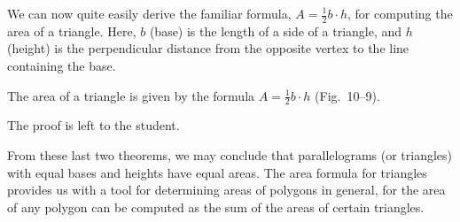 \documentclass[11pt]{book}
\theoremstyle{bkplain}
\theoremstyle{XIplainnote}
\theoremstyle{bkplain}
\theoremstyle{bkplain}
\begin{document}
We can now quite easily derive the familiar formula,
$A = \frac{1}{2}b \cdot h$, for computing the area of a triangle. Here, $b$
(base) is the length of a side of a triangle, and $h$ (height) is the
perpendicular distance from the opposite vertex to the line containing the
base.

\FIGXNINE

\begin{theorem}
The area of a triangle is given by the formula
$A = \frac{1}{2}b \cdot h$ (Fig.~10--9).
\end{theorem}

The proof is left to the student.

From these last two theorems, we may conclude that parallelograms (or
triangles) with equal bases and heights have equal areas. The area formula for
triangles provides us with a tool for determining areas of polygons in general,
for the area of any polygon can be computed as the sum of the areas of certain
triangles.
\end{document}
